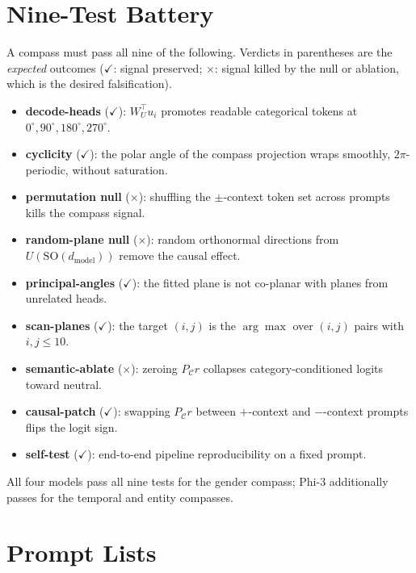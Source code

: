 \section{Nine-Test Battery}
\label{app:battery}

A compass must pass all nine of the following. Verdicts in
parentheses are the \emph{expected} outcomes ($\checkmark$:
signal preserved; $\times$: signal killed by the null or
ablation, which is the desired falsification).

\begin{itemize}
    \item \textbf{decode-heads} ($\checkmark$): $W_U^{\top} u_i$
    promotes readable categorical tokens at $0^\circ, 90^\circ,
    180^\circ, 270^\circ$.
    \item \textbf{cyclicity} ($\checkmark$): the polar angle of
    the compass projection wraps smoothly, $2\pi$-periodic,
    without saturation.
    \item \textbf{permutation null} ($\times$): shuffling the
    $\pm$-context token set across prompts kills the compass
    signal.
    \item \textbf{random-plane null} ($\times$): random
    orthonormal directions from $U(\mathrm{SO}(d_{\text{model}}))$
    remove the causal effect.
    \item \textbf{principal-angles} ($\checkmark$): the fitted
    plane is not co-planar with planes from unrelated heads.
    \item \textbf{scan-planes} ($\checkmark$): the target
    $(i, j)$ is the $\arg\max$ over $(i, j)$ pairs with
    $i, j \le 10$.
    \item \textbf{semantic-ablate} ($\times$): zeroing
    $P_{\mathcal{C}} r$ collapses category-conditioned logits
    toward neutral.
    \item \textbf{causal-patch} ($\checkmark$): swapping
    $P_{\mathcal{C}} r$ between $+$-context and $-$-context
    prompts flips the logit sign.
    \item \textbf{self-test} ($\checkmark$): end-to-end pipeline
    reproducibility on a fixed prompt.
\end{itemize}

All four models pass all nine tests for the gender compass;
Phi-3 additionally passes for the temporal and entity compasses.

\section{Prompt Lists}
\label{app:prompts}

